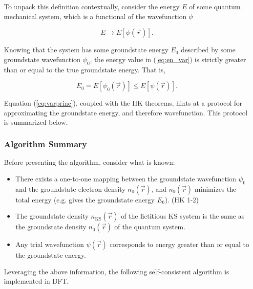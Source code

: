         To unpack this definition contextually, consider the energy $E$ of some quantum mechanical system, which is a functional of the wavefunction $\psi$
        
        \begin{equation}
        \label{eq:en_var}
            E \rightarrow E[\psi(\vec{r})].
        \end{equation}
        
        \noindent Knowing that the system has some groundstate energy $E_0$ described by some groundstate wavefunction $\psi_0$, the energy value in (\ref{eq:en_var}) is strictly greater than or equal to the true groundstate energy. That is,
        
        \begin{equation}
            \label{eq:varprinc}
            E_0 = E[\psi_0(\vec{r})] \le E[\psi(\Vec{r})].
        \end{equation}
        
        Equation (\ref{eq:varprinc}), coupled with the HK theorems, hints at a protocol for approximating the groundstate energy, and therefore wavefunction. This protocol is summarized below.
        
        \subsubsection{Algorithm Summary}
        
        Before presenting the algorithm, consider what is known:
        
        \begin{itemize}
            \item There exists a one-to-one mapping between the groundstate wavefunction $\psi_0$ and the groundstate electron density $n_0(\Vec{r})$, and $n_0(\Vec{r})$ minimizes the total energy (e.g. gives the groundstate energy $E_0$). (HK 1-2)
            \item The groundstate density $n_\text{KS}(\Vec{r})$ of the fictitious KS system is the same as the groundstate density $n_0(\Vec{r})$ of the quantum system. 
            \item Any trial wavefunction $\psi(\Vec{r})$ corresponds to energy greater than or equal to the groundstate energy.
        \end{itemize}
        
        \noindent Leveraging the above information, the following self-consistent algorithm is implemented in DFT.
        
